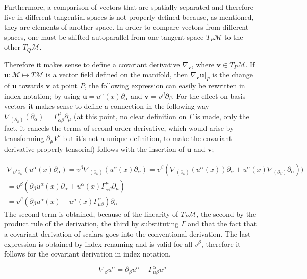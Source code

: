 \documentclass[12pt,a4paper]{article}
\begin{document}
	
	Furthermore, a comparison of vectors that are spatially separated and therefore live in different tangential spaces is not properly defined because, as mentioned, they are elements of another space. In order to compare vectors from different spaces, one must be shifted autoparallel from one tangent space $T_P\mathcal{M}$ to the other $T_Q\mathcal{M}$.
	
	
	Therefore it makes sense to define a covariant derivative $\nabla_\textbf{v}$, where $\textbf{v} \in T_P\mathcal{M}$. If $\textbf{u} : \mathcal{M} \mapsto T\mathcal{M}$ is a vector field defined on the manifold, then $\nabla_\textbf{v}\textbf{u} |_P$ is the change of $\textbf{u}$ towards $\textbf{v}$ at point $P$, the following expression can easily be rewritten in index notation; by using
	$\textbf{u} = u^\alpha(x) \partial_\alpha$ and $\textbf{v} = v^\beta \partial_\beta$. For the effect on basis vectors it makes sense to define a connection in the following way $\nabla_{(\partial_\beta)}(\partial_\alpha) = \Gamma^\mu_{\alpha \beta} \partial_\mu$ (at this point, no clear definition on $\Gamma$ is made, only the fact, it cancels the terms of second order derivative, which would arise by transforming $\partial_\mu V^\nu$ but it's not a unique definition, to make the covariant derivative properly tensorial) follows with the insertion of $\textbf{u}$ and $\textbf{v} $;
	
	\begin{multline}
		\label{kovariant}
		\nabla_{v^\beta \partial_\beta}(u^\alpha(x) \partial_\alpha) = v^\beta \nabla_{(\partial_\beta)} (u^\alpha(x)\partial_\alpha ) = v^\beta \left(\nabla_{(\partial_\beta)} (u^\alpha(x)) \partial_\alpha +  u^\alpha(x) \nabla_{(\partial_\beta)} \partial_\alpha \right)) \\ = v^\beta \left(\partial_\beta u^\alpha(x)  \partial_\alpha +  u^\alpha(x) \Gamma^\mu_{\alpha \beta} \partial_\mu\right)  \\ = v^\beta \left(\partial_\beta u^\alpha(x)   +  u^\mu(x) \Gamma^\alpha_{\mu \beta}\right) \partial_\alpha 
	\end{multline}
	The second term is obtained, because of the linearity of $T_P\mathcal{M}$, the second by the product rule of the derivation, the third by substituting $\Gamma$ and that the fact that a covariant derivation of scalars goes into the conventional derivation. The last expression is obtained by index renaming and is valid for all $v^\beta$, therefore it follows for the covariant derivation in index notation,
	

	$$\nabla_\beta u^\alpha = \partial_\beta u^\alpha  +   \Gamma^\alpha_{\mu \beta} u^\mu$$
	
\end{document}
